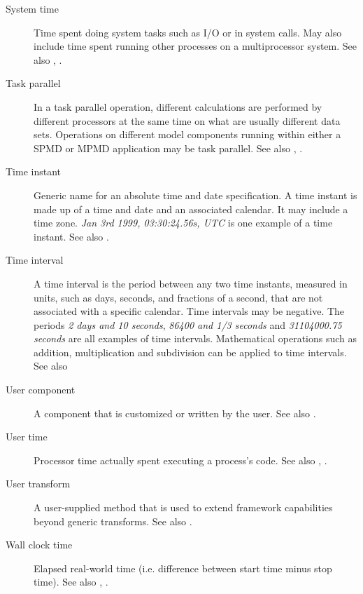 \begin{description}
\item [System time] \label{glos:SysTime}Time spent doing system tasks 
  such as I/O or in system calls.  May also include time spent running 
  other processes on a multiprocessor system. See also , .

\item[Task parallel] \label{glos:TaskParallel}  In a task parallel operation,
  different calculations are performed by different processors at the same time
  on what are usually different data sets.  Operations on different model 
  components running within either a SPMD or MPMD application may be task 
  parallel. See also , . 

\item [Time instant] \label{glos:TimeInstant}
  Generic name for an absolute time and date specification. A time instant is made 
  up of a time and date and an associated calendar. It may include a time zone.
  \emph{Jan 3rd 1999, 03:30:24.56s, UTC} is one example of a time instant.
  See also .

\item [Time interval] \label{glos:TimeInterval} A time interval is the
  period between any two time instants, measured in units, such as days, 
  seconds, and fractions of a second, that are not associated with a specific
  calendar.  Time intervals may be negative.  The periods \emph{2 days and 10 seconds}, 
  \emph{86400 and 1/3 seconds} and \emph{31104000.75 seconds} are all examples of time intervals.  
  Mathematical operations such as addition, multiplication and subdivision 
  can be applied to time intervals. See also 

\item [User component] \label{UserComp} A component that is customized or
  written by the user.  See also .

\item [User time] \label{UserTime} Processor time actually spent executing 
  a process's code. See also , 
  .

\item[User transform] \label{glos:UserTrans} A user-supplied 
  method that is used to extend framework capabilities beyond generic 
  transforms. See also . 

\item [Wall clock time] \label{WallClockTime} Elapsed real-world time 
  (i.e. difference between start time minus stop time).
  See also , .

\end{description}
